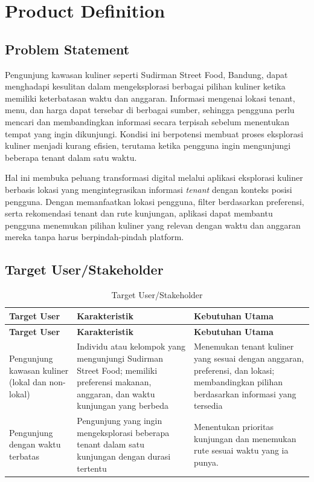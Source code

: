\chapter{Product Definition}
\label{bab:product-definition}
\section{Problem Statement}

Pengunjung kawasan kuliner seperti Sudirman Street Food, Bandung, dapat menghadapi kesulitan dalam mengeksplorasi berbagai pilihan kuliner ketika memiliki keterbatasan waktu dan anggaran. Informasi mengenai lokasi tenant, menu, dan harga dapat tersebar di berbagai sumber, sehingga pengguna perlu mencari dan membandingkan informasi secara terpisah sebelum menentukan tempat yang ingin dikunjungi. Kondisi ini berpotensi membuat proses eksplorasi kuliner menjadi kurang efisien, terutama ketika pengguna ingin mengunjungi beberapa tenant dalam satu waktu.

Hal ini membuka peluang transformasi digital melalui aplikasi eksplorasi kuliner berbasis lokasi yang mengintegrasikan informasi \textit{tenant }dengan konteks posisi pengguna. Dengan memanfaatkan lokasi pengguna, filter berdasarkan preferensi, serta rekomendasi tenant dan rute kunjungan, aplikasi dapat membantu pengguna menemukan pilihan kuliner yang relevan dengan waktu dan anggaran mereka tanpa harus berpindah-pindah platform.

\section{Target User/Stakeholder}

\begin{longtable}{|L{0.273}|L{0.354}|L{0.373}|}
\caption{Target User/Stakeholder}\\
\hline
{}\textbf{Target User} & \textbf{Karakteristik} & \textbf{Kebutuhan Utama} \\ \hline
\endfirsthead
\hline
{}\textbf{Target User} & \textbf{Karakteristik} & \textbf{Kebutuhan Utama} \\ \hline
\endhead
Pengunjung kawasan kuliner (lokal dan non-lokal) & Individu atau kelompok yang mengunjungi Sudirman Street Food; memiliki preferensi makanan, anggaran, dan waktu kunjungan yang berbeda & Menemukan tenant kuliner yang sesuai dengan anggaran, preferensi, dan lokasi; membandingkan pilihan berdasarkan informasi yang tersedia \\ \hline
Pengunjung dengan waktu terbatas & Pengunjung yang ingin mengeksplorasi beberapa tenant dalam satu kunjungan dengan durasi tertentu & Menentukan prioritas kunjungan dan menemukan rute sesuai waktu yang ia punya. \\ \hline
\end{longtable}

